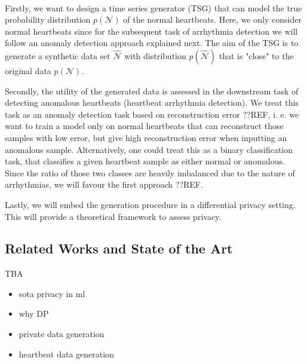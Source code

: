 \paragraph{}

Firstly, we want to design a time series generator (TSG) that can model the true probability distribution $p(\mathcal{N})$ of the normal heartbeats. Here, we only consider normal heartbeats since for the subsequent task of arrhythmia detection we will follow an anomaly detection approach explained next. The aim of the TSG is to generate a synthetic data set $\widehat{\mathcal{N}}$ with distribution $p(\widehat{\mathcal{N}})$ that is "close" to the original data $p(\mathcal{N})$.

Secondly, the utility of the generated data is assessed in the downstream task of detecting anomalous heartbeats (heartbeat arrhythmia detection). We treat this task as an anomaly detection task based on reconstruction error ??REF, i. e. we want to train a model only on normal heartbeats that can reconstruct those samples with low error, but give high reconstruction error when inputting an anomalous sample. Alternatively, one could treat this as a binary classification task, that classifies a given heartbeat sample as either normal or anomalous. Since the ratio of those two classes are heavily imbalanced due to the nature of arrhythmias, we will favour the first approach ??REF.

Lastly, we will embed the generation procedure in a differential privacy setting. This will provide a theoretical framework to assess privacy.

\subsection{Related Works and State of the Art}
TBA
\begin{itemize}
    \item sota privacy in ml 
    \item why DP
    \item private data generation
    \item heartbeat data generation
\end{itemize}
